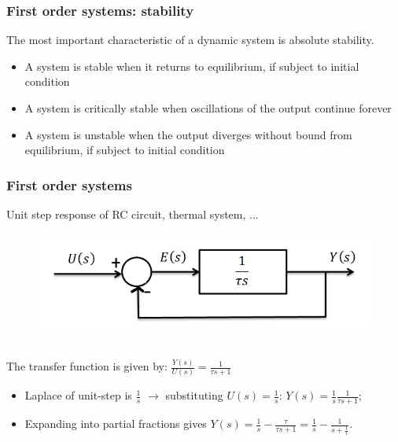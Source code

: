 \begin{frame}
\frametitle{First order systems: stability}
	The most important characteristic of a dynamic system is absolute stability.
	\begin{itemize}
		\item A system is stable when it returns to equilibrium, if subject to initial condition
		\item A system is critically stable when oscillations of the output continue forever
		\item A system is unstable when the output diverges without bound from equilibrium, if subject to initial condition
	\end{itemize}
\end{frame}

\begin{frame}
\frametitle{First order systems}
\begin{example}
	Unit step response of RC circuit, thermal system, ...
	\vspace{-0.8em}
	\begin{figure}
		\includegraphics[width=0.6\linewidth]{Afbeelding1}
	\end{figure}
	\vspace{-0.8em}
	\\The transfer function is given by: $\frac{Y(s)}{U(s)} = \frac{1}{\tau s +1}$
	\begin{itemize}
		\item Laplace of unit-step is $\frac{1}{s}$ $\rightarrow$ substituting $U(s)= \frac{1}{s}$: $Y(s) = \frac{1}{s}\frac{1}{\tau s +1}$;
		\item Expanding into partial fractions gives $Y(s)= \frac{1}{s} - \frac{\tau}{\tau s +1} = \frac{1}{s} - \frac{1}{s+\frac{1}{\tau}}$.
	\end{itemize}
\end{example}
\end{frame}


